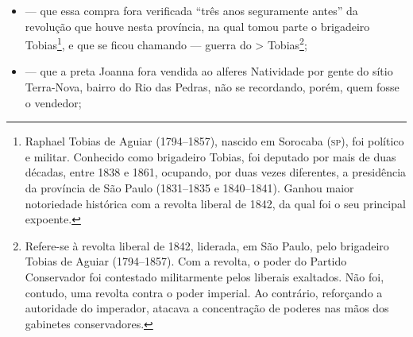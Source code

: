 \begin{itemize}
\item
  --- que essa compra fora verificada ``três anos seguramente antes'' da
  revolução que houve nesta província, na qual tomou parte o brigadeiro
  Tobias\footnote{ Raphael Tobias de Aguiar (1794--1857), nascido em
    Sorocaba (\textsc{sp}), foi político e militar. Conhecido como brigadeiro
    Tobias, foi deputado por mais de duas décadas, entre 1838 e 1861,
    ocupando, por duas vezes diferentes, a presidência da província de
    São Paulo (1831--1835 e 1840--1841). Ganhou maior notoriedade
    histórica com a revolta liberal de 1842, da qual foi o seu principal
    expoente.}, e que se ficou chamando --- guerra do \textgreater{}
  Tobias\footnote{ Refere-se à revolta liberal de 1842, liderada, em
    São Paulo, pelo brigadeiro Tobias de Aguiar (1794--1857). Com a
    revolta, o poder do Partido Conservador foi contestado militarmente
    pelos liberais exaltados. Não foi, contudo, uma revolta contra o
    poder imperial. Ao contrário, reforçando a autoridade do imperador,
    atacava a concentração de poderes nas mãos dos gabinetes
    conservadores.};
\item
  --- que a preta Joanna fora vendida ao alferes Natividade por gente do
  sítio Terra-Nova, bairro do Rio das Pedras, não se recordando, porém,
  quem fosse o vendedor;
\end{itemize}

